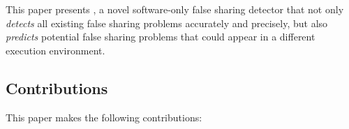 


This paper presents \Predator{}, a novel software-only false sharing detector that not only \emph{detects} all existing false sharing problems accurately and precisely, but also \emph{predicts} potential false sharing problems that could appear in a different execution environment.

\subsection*{Contributions}

This paper makes the following contributions:

